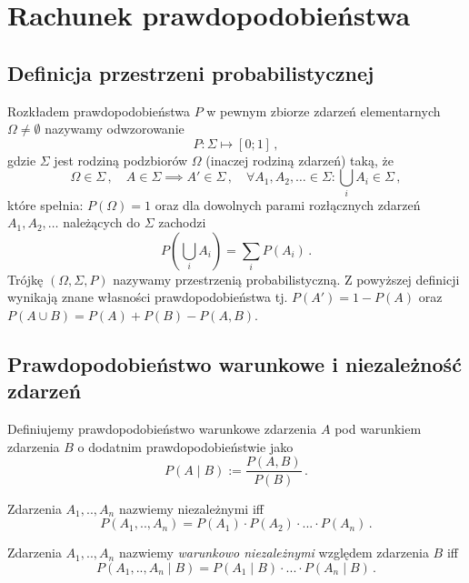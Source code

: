 \documentclass{myclass}
\author{Bartosz Hanc}
\begin{document}
\tableofcontents
\newpage

\section{Rachunek prawdopodobieństwa}

\subsection{Definicja przestrzeni probabilistycznej}

Rozkładem prawdopodobieństwa \(P\) w pewnym zbiorze zdarzeń elementarnych \(\Omega \neq \emptyset\)
nazywamy odwzorowanie
\begin{equation*}
    P: \Sigma \mapsto [0;1]\,,
\end{equation*}
gdzie \(\Sigma\) jest rodziną podzbiorów \(\Omega\) (inaczej rodziną zdarzeń) taką, że
\begin{equation*}
    \Omega \in \Sigma\,,\quad A \in \Sigma \implies A' \in \Sigma\,,\quad \forall A_1, A_2, \ldots \in \Sigma : \bigcup_{i}
    A_i \in \Sigma\,,
\end{equation*}
które spełnia: \(P(\Omega) = 1\) oraz dla dowolnych parami rozłącznych zdarzeń \(A_1, A_2, \ldots\)
należących do \(\Sigma\) zachodzi
\begin{equation*}
    P\left(\bigcup_i A_i\right) = \sum_i P(A_i)\,.
\end{equation*}
Trójkę \((\Omega, \Sigma, P)\) nazywamy przestrzenią probabilistyczną. Z powyższej definicji
wynikają znane własności prawdopodobieństwa tj. \(P(A') = 1 - P(A)\) oraz \(P(A \cup B) = P(A) +
P(B) - P(A , B)\). 

\subsection{Prawdopodobieństwo warunkowe i niezależność zdarzeń}

Definiujemy prawdopodobieństwo warunkowe zdarzenia \(A\) pod warunkiem zdarzenia \(B\) o dodatnim
prawdopodobieństwie jako
\begin{equation*}
    P(A \mid B) := \frac{P(A , B)}{P(B)}\,.
\end{equation*}

Zdarzenia \(A_1,..,A_n\) nazwiemy niezależnymi iff
\begin{equation*}
    P(A_1,..,A_n) = P(A_1) \cdot P(A_2) \cdot ... \cdot P(A_n)\,.
\end{equation*}

Zdarzenia \(A_1,..,A_n\) nazwiemy \textit{warunkowo niezależnymi} względem zdarzenia \(B\) iff
\begin{equation*}
    P(A_1,..,A_n \mid B) = P(A_1 \mid B) \cdot ... \cdot P(A_n \mid B)\,.
\end{equation*}
\end{document}

